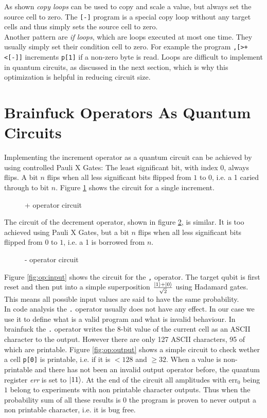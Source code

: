 \documentclass[11pt, a4paper]{article}
\DeclarePairedDelimiter\ket{\lvert}{\rangle}
\begin{document}
As shown \textit{copy loops} can be used to copy and scale a value, but always set the source cell to zero. The \verb'[-]' program is a special copy loop without any target cells and thus simply sets the source cell to zero. \\
Another pattern are \textit{if loops}, which are loops executed at most one time. They usually simply set their condition cell to zero. For example the program \verb',[>+<[-]]' increments \verb'p[1]' if a non-zero byte is read. Loops are difficult to implement in quantum circuits, as discussed in the next section, which is why this optimization is helpful in reducing circuit size.



\section{Brainfuck Operators As Quantum Circuits} \label{sec:circuits}
Implementing the increment operator as a quantum circuit can be achieved by using controlled Pauli X Gates: The least significant bit, with index 0, always flips. A bit $n$ flips when all less significant bits flipped from $1$ to $0$, i.e. a 1 caried through to bit $n$. Figure \ref{fig:op:plus} shows the circuit for a single increment.
\begin{figure}[H]
	\centering
	
	\caption{+ operator circuit}
	\label{fig:op:plus}
\end{figure}

The circuit of the decrement operator, shown in figure \ref{fig:op:minus}, is similar. It is too achieved using Pauli X Gates, but a bit $n$ flips when all less significant bits flipped from $0$ to $1$, i.e. a 1 is borrowed from $n$.
\begin{figure}[H]
	\centering
	
	\caption{- operator circuit}
	\label{fig:op:minus}
\end{figure}

Figure \ref{fig:op:input} shows the circuit for the \verb',' operator. The target qubit is first reset and then put into a simple superposition $\frac{\ket{1} + \ket{0}}{\sqrt{2}}$ using Hadamard gates. This means all possible input values are said to have the same probability. \\
In code analysis the \verb'.' operator usually does not have any effect. In our case we use it to define what is a valid program and what is invalid behaviour. In brainfuck the \verb'.' operator writes the 8-bit value of the current cell as an ASCII character to the output. However there are only 127 ASCII characters, 95 of which are printable. Figure \ref{fig:op:output} shows a simple circuit to check wether a cell \verb'p[0]' is printable, i.e. if it is $< 128$ and $\geq 32$. When a value is non-printable and there has not been an invalid output operator before, the quantum register \textit{err} is set to $\ket{11}$. At the end of the circuit all amplitudes with $\text{err}_0$ being $1$ belong to experiments with non printable character outputs. Thus when the probability sum of all these results is 0 the program is proven to never output a non printable character, i.e. it is bug free.
\end{document}
